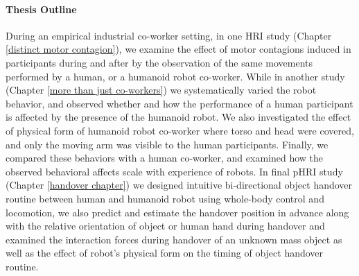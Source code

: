 \documentclass[a4paper, 11pt, oneside]{Thesis}
\begin{document}
\paragraph*{Thesis Outline\\}
During an empirical industrial co-worker setting, in one HRI study (Chapter \ref{distinct motor contagion}), we examine the effect of motor contagions induced in participants during and after by the observation of the same movements performed by a human, or a humanoid robot co-worker. While in  another study (Chapter \ref{more than just co-workers}) we systematically varied the robot behavior, and observed whether and how the performance of a human participant is affected by the presence of the humanoid robot. We also investigated the effect of physical form of humanoid robot co-worker where torso and head were covered, and only the moving arm was visible to the human participants. Finally, we compared these behaviors with a human co-worker, and examined how the observed behavioral affects scale with experience of robots. In final pHRI study (Chapter \ref{handover chapter}) we designed intuitive bi-directional object handover routine between human and humanoid robot using whole-body control and locomotion, we also predict and estimate the handover position in advance along with the relative orientation of object or human hand during handover and examined the interaction forces during handover of an unknown mass object as well as the effect of robot's physical form on the timing of object handover routine.





%


\end{document}

